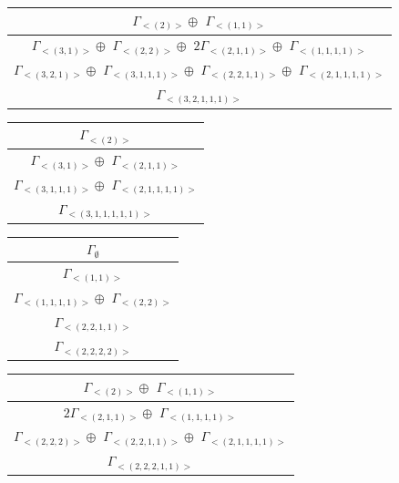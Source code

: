 \bigskip
\begin{minipage}{.6\textwidth}
\centering
\begin{tabular}{|c|}\hline
$\Gamma_{<(
2
)>} \oplus$
$\Gamma_{<(
1 , 
1
)>}$
\\ \hline
$\Gamma_{<(
3 , 
1
)>} \oplus$
$\Gamma_{<(
2 , 
2
)>} \oplus$
$ 2 \Gamma_{<(
2 , 
1 , 
1
)>} \oplus$
$\Gamma_{<(
1 , 
1 , 
1 , 
1
)>}$
\\ \hline
$\Gamma_{<(
3 , 
2 , 
1
)>} \oplus$
$\Gamma_{<(
3 , 
1 , 
1 , 
1
)>} \oplus$
$\Gamma_{<(
2 , 
2 , 
1 , 
1
)>} \oplus$
$\Gamma_{<(
2 , 
1 , 
1 , 
1 , 
1
)>}$
\\ \hline
$\Gamma_{<(
3 , 
2 , 
1 , 
1 , 
1
)>}$
\\
\hline\end{tabular}\end{minipage}
\begin{minipage}{.4\textwidth}
\centering
\begin{tabular}{|c|}\hline
$\Gamma_{<(
2
)>}$
\\ \hline
$\Gamma_{<(
3 , 
1
)>} \oplus$
$\Gamma_{<(
2 , 
1 , 
1
)>}$
\\ \hline
$\Gamma_{<(
3 , 
1 , 
1 , 
1
)>} \oplus$
$\Gamma_{<(
2 , 
1 , 
1 , 
1 , 
1
)>}$
\\ \hline
$\Gamma_{<(
3 , 
1 , 
1 , 
1 , 
1 , 
1
)>}$
\\
\hline\end{tabular}\end{minipage}
\bigskip
\begin{minipage}{.4\textwidth}
\centering
\begin{tabular}{|c|}\hline
$\Gamma_\emptyset$
\\ \hline
$\Gamma_{<(
1 , 
1
)>}$
\\ \hline
$\Gamma_{<(
1 , 
1 , 
1 , 
1
)>} \oplus$
$\Gamma_{<(
2 , 
2
)>}$
\\ \hline
$\Gamma_{<(
2 , 
2 , 
1 , 
1
)>}$
\\ \hline
$\Gamma_{<(
2 , 
2 , 
2 , 
2
)>}$
\\
\hline\end{tabular}\end{minipage}
\begin{minipage}{.6\textwidth}
\centering
\begin{tabular}{|c|}\hline
$\Gamma_{<(
2
)>} \oplus$
$\Gamma_{<(
1 , 
1
)>}$
\\ \hline
$ 2 \Gamma_{<(
2 , 
1 , 
1
)>} \oplus$
$\Gamma_{<(
1 , 
1 , 
1 , 
1
)>}$
\\ \hline
$\Gamma_{<(
2 , 
2 , 
2
)>} \oplus$
$\Gamma_{<(
2 , 
2 , 
1 , 
1
)>} \oplus$
$\Gamma_{<(
2 , 
1 , 
1 , 
1 , 
1
)>}$
\\ \hline
$\Gamma_{<(
2 , 
2 , 
2 , 
1 , 
1
)>}$
\\
\hline\end{tabular}\end{minipage}

